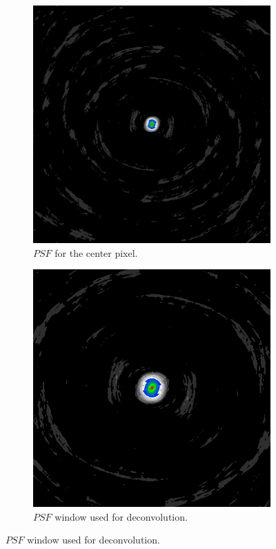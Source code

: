 \begin{figure}[h]
	\centering
	\begin{subfigure}[b]{0.4\linewidth}
		\includegraphics[width=\linewidth]{./chapters/01.intro/mk2/psf.png}
		\caption{$PSF$ for the center pixel.}
		\label{intro:major:dynamic:psf}
	\end{subfigure}
	\begin{subfigure}[b]{0.4\linewidth}
	\includegraphics[width=\linewidth]{./chapters/01.intro/mk2/psfCut.png}
	\caption{$PSF$ window used for deconvolution.}
	\label{intro:major:dynamic:psfCut}
	\end{subfigure}


\end{figure}
